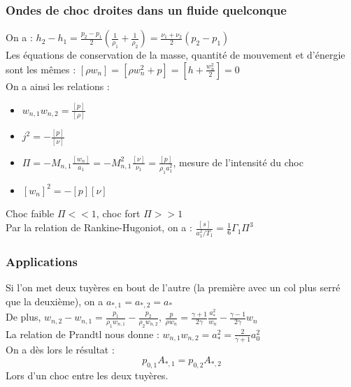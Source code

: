 \documentclass[../main.tex]{subfiles}
\begin{document}
\subsubsection{Ondes de choc droites dans un fluide quelconque}
On a : $h_2-h_1 = \frac{p_2-p_1}{2} (\frac{1}{\rho_1} + \frac{1}{\rho_2}) = \frac{\nu_1 + \nu_2}{2} (p_2-p_1)$\\

Les équations de conservation de la masse, quantité de mouvement et d'énergie sont les mêmes : $[\rho w_n] = [\rho w_n^2 + p] = [h + \frac{w_n^2}{2}] = 0$\\

On a ainsi les relations : \begin{itemize}
    \item $w_{n,1}w_{n,2} = \frac{[p]}{[\rho]}$\\
    \item $j^2 = -\frac{[p]}{[\nu]}$\\
    \item $\Pi = -M_{n,1} \frac{[w_n]}{a_1} = -M_{n,1}^2 \frac{[\nu]}{\nu_1} = \frac{[p]}{\rho_1 a_1^2}$, mesure de l'intensité du choc\\
    \item $[w_n]^2 = -[p][\nu]$\\
\end{itemize}

Choc faible $\Pi <<1$, choc fort $\Pi >> 1$\\

Par la relation de Rankine-Hugoniot, on a : $\frac{[s]}{a_1^2/T_1} = \frac{1}{6} \Gamma_1 \Pi^3$\\

\subsubsection{Applications}
Si l'on met deux tuyères en bout de l'autre (la première avec un col plus serré que la deuxième), on a $a_{*,1} = a_{*,2} = a_*$\\
De plus, $w_{n,2} - w_{n,1} = \frac{p_1}{\rho_1 w_{n,1}} - \frac{p_2}{\rho_2 w_{n,2}}$, $\frac{p}{\rho w_n} = \frac{\gamma+1}{2\gamma} \frac{a_*^2}{w_n} - \frac{\gamma-1}{2\gamma} w_n$\\

La relation de Prandtl nous donne : $w_{n,1} w_{n,2} = a_*^2 = \frac{2}{\gamma+1} a_0^2$\\

On a dès lors le résultat : \begin{equation}
    p_{0,1} A_{*,1} = p_{0,2} A_{*,2}
\end{equation}
Lors d'un choc entre les deux tuyères. \\
\end{document}
